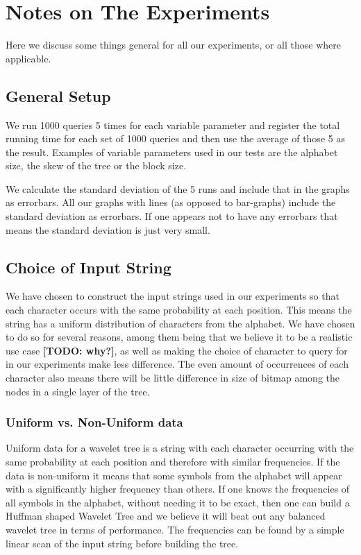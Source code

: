 \section{Notes on The Experiments}
Here we discuss some things general for all our experiments, or all those where applicable.

\subsection{General Setup}
\label{sec:ExpNotesGeneralSetup}
We run 1000 queries 5 times for each variable parameter and register the total running time for each set of 1000 queries and then use the average of those 5 as the result.
Examples of variable parameters used in our tests are the alphabet size, the skew of the tree or the block size.

We calculate the standard deviation of the 5 runs and include that in the graphs as errorbars.
All our graphs with lines (as opposed to bar-graphs) include the standard deviation as errorbars.
If one appears not to have any errorbars that means the standard deviation is just very small.

\subsection{Choice of Input String}
\label{}
We have chosen to construct the input strings used in our experiments so that each character occurs with the same probability at each position.
This means the string has a uniform distribution of characters from the alphabet.
We have chosen to do so for several reasons, among them being that we believe it to be a realistic use case \textbf{[TODO: why?]}, as well as making the choice of character to query for in our experiments make less difference.
The even amount of occurrences of each character also means there will be little difference in size of bitmap among the nodes in a single layer of the tree.

\subsubsection{Uniform vs. Non-Uniform data}
\label{sec:expnotesUniformVsNonuniform}
Uniform data for a wavelet tree is a string with each character occurring with the same probability at each position and therefore with similar frequencies.
If the data is non-uniform it means that some symbols from the alphabet will appear with a significantly higher frequency than others.
If one knows the frequencies of all symbols in the alphabet, without needing it to be exact, then one can build a Huffman shaped Wavelet Tree and we believe it will beat out any balanced wavelet tree in terms of performance.
The frequencies can be found by a simple linear scan of the input string before building the tree.

